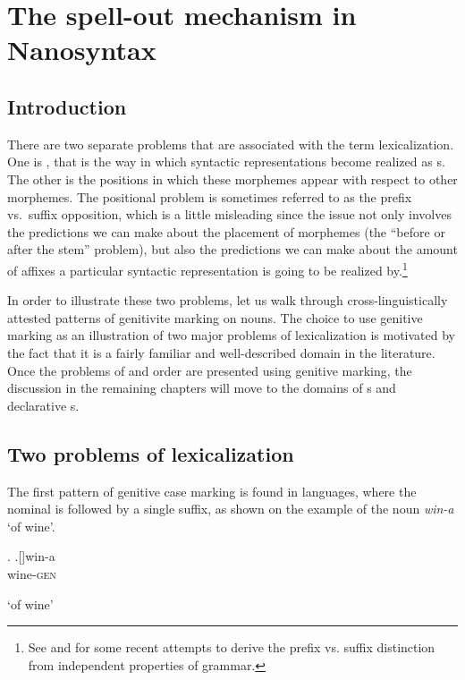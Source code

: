 \chapter{The spell-out mechanism in Nanosyntax}\label{chapter:nanosyntax}

\section{Introduction}

There are two separate problems that are associated with the term lexicalization. One is , that is the way in which syntactic representations become realized as s. The other is the positions in which these morphemes appear with respect to other morphemes. The positional problem  is sometimes referred to as the prefix vs.\ suffix opposition, which is a little misleading since the issue not only involves the predictions we can make about the placement of morphemes (the ``before or after the stem'' problem), but also the predictions we can make about the amount of affixes a particular syntactic representation is going to be realized by.\footnote{See \citet[135--138, 154--156]{DiSciullo2005} and \cite{Kayne2017} for some recent attempts to derive the prefix vs. suffix distinction from independent properties of grammar.
}%
\par
In order to illustrate these two problems, let us walk through cross-lin\-guis\-tic\-ally attested patterns of genitivite marking on nouns.
The choice to use genitive marking as an illustration of two major problems of lexicalization is motivated by the fact that it is a fairly familiar and well-described domain in the literature. Once the problems of  and  order are presented using genitive marking, the discussion in the remaining chapters will move to the domains of  s and declarative s.

\section{Two problems of lexicalization}

The first pattern of genitive case marking is found in  languages, where the nominal  is followed by a single suffix, as shown on the example of the  noun \textit{win-a} `of wine'.\largerpage
 
\ex. 
\ag.[]\hspace{-20pt}win-a\\
\hspace{-20pt}wine-\textsc{gen}\\
\hspace{-20pt}\strut `of wine'


